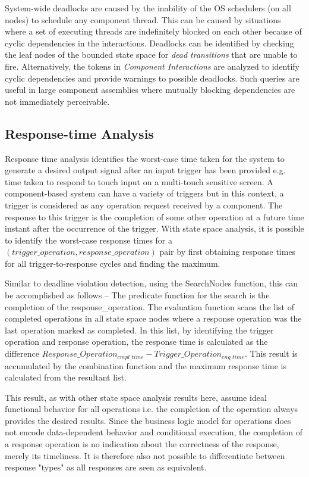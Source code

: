System-wide deadlocks are caused by the inability of the OS schedulers (on all nodes) to schedule any component thread. This can be caused by situations where a set of executing threads are indefinitely blocked on each other because of cyclic dependencies in the interactions. Deadlocks can be identified by checking the leaf nodes of the bounded state space for \emph{dead transitions} that are unable to fire. Alternatively, the tokens in \emph{Component Interactions} are analyzed to identify cyclic dependencies and provide warnings to possible deadlocks. Such queries are useful in large component assemblies where mutually blocking dependencies are not immediately perceivable. 

\subsection{Response-time Analysis}

Response time analysis identifies the worst-case time taken for the system to generate a desired output signal after an input trigger has been provided e.g. time taken to respond to touch input on a multi-touch sensitive screen. A component-based system can have a variety of triggers but in this context, a trigger is considered as any operation request received by a component. The response to this trigger is the completion of some other operation at a future time instant after the occurrence of the trigger. With state space analysis, it is possible to identify the worst-case response times for a $(trigger\_operation, response\_operation)$ pair by first obtaining response times for all trigger-to-response cycles and finding the maximum. 

Similar to deadline violation detection, using the SearchNodes function, this can be accomplished as follows -- The predicate function for the search is the completion of the response\_operation. The evaluation function scans the list of completed operations in all state space nodes where a response operation was the last operation marked as completed. In this list, by identifying the trigger operation and response operation, the response time is calculated as the difference $Response\_Operation_{cmpl\_time} - Trigger\_Operation_{enq\_time}$. This result is accumulated by the combination function and the maximum response time is calculated from the resultant list.

This result, as with other state space analysis results here, assume ideal functional behavior for all operations i.e. the completion of the operation always provides the desired results. Since the business logic model for operations does not encode data-dependent behavior and conditional execution, the completion of a response operation is no indication about the correctness of the response, merely its timeliness. It is therefore also not possible to differentiate between response "types" as all responses are seen as equivalent. 

